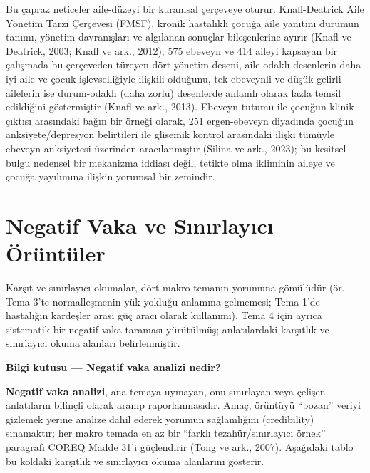 \documentclass[
  turkish,
  a4paper,
  DIV=11,
  numbers=noendperiod]{scrreprt}
\begin{document}
Bu çapraz neticeler aile-düzeyi bir kuramsal çerçeveye oturur.
Knafl-Deatrick Aile Yönetim Tarzı Çerçevesi (FMSF), kronik hastalıklı
çocuğa aile yanıtını durumun tanımı, yönetim davranışları ve algılanan
sonuçlar bileşenlerine ayırır (Knafl ve Deatrick, 2003; Knafl ve ark.,
2012); 575 ebeveyn ve 414 aileyi kapsayan bir çalışmada bu çerçeveden
türeyen dört yönetim deseni, aile-odaklı desenlerin daha iyi aile ve
çocuk işlevselliğiyle ilişkili olduğunu, tek ebeveynli ve düşük gelirli
ailelerin ise durum-odaklı (daha zorlu) desenlerde anlamlı olarak fazla
temsil edildiğini göstermiştir (Knafl ve ark., 2013). Ebeveyn tutumu ile
çocuğun klinik çıktısı arasındaki bağın bir örneği olarak, 251
ergen-ebeveyn diyadında çocuğun anksiyete/depresyon belirtileri ile
glisemik kontrol arasındaki ilişki tümüyle ebeveyn anksiyetesi üzerinden
aracılanmıştır (Silina ve ark., 2023); bu kesitsel bulgu nedensel bir
mekanizma iddiası değil, tetikte olma ikliminin aileye ve çocuğa
yayılımına ilişkin yorumsal bir zemindir.

\chapter{Negatif Vaka ve Sınırlayıcı Örüntüler}\label{sec-negatif}

Karşıt ve sınırlayıcı okumalar, dört makro temanın yorumuna gömülüdür
(ör. Tema 3'te normalleşmenin yük yokluğu anlamına gelmemesi; Tema 1'de
hastalığın kardeşler arası güç aracı olarak kullanımı). Tema 4 için
ayrıca sistematik bir negatif-vaka taraması yürütülmüş; anlatılardaki
karşıtlık ve sınırlayıcı okuma alanları belirlenmiştir.

\begin{tcolorbox}[enhanced jigsaw, arc=.35mm, bottomrule=.15mm, bottomtitle=1mm, breakable, colback=white, colbacktitle=quarto-callout-note-color!10!white, colframe=quarto-callout-note-color-frame, coltitle=black, left=2mm, leftrule=.75mm, opacityback=0, opacitybacktitle=0.6, rightrule=.15mm, title=\textcolor{quarto-callout-note-color}{\faInfo}\hspace{0.5em}{Not}, titlerule=0mm, toprule=.15mm, toptitle=1mm]

\textbf{Bilgi kutusu --- Negatif vaka analizi nedir?}

\textbf{Negatif vaka analizi}, ana temaya uymayan, onu sınırlayan veya
çelişen anlatıların bilinçli olarak aranıp raporlanmasıdır. Amaç,
örüntüyü ``bozan'' veriyi gizlemek yerine analize dahil ederek yorumun
sağlamlığını (credibility) sınamaktır; her makro temada en az bir
``farklı tezahür/sınırlayıcı örnek'' paragrafı COREQ Madde 31'i
güçlendirir (Tong ve ark., 2007). Aşağıdaki tablo bu koldaki karşıtlık
ve sınırlayıcı okuma alanlarını gösterir.

\end{tcolorbox}
\end{document}
